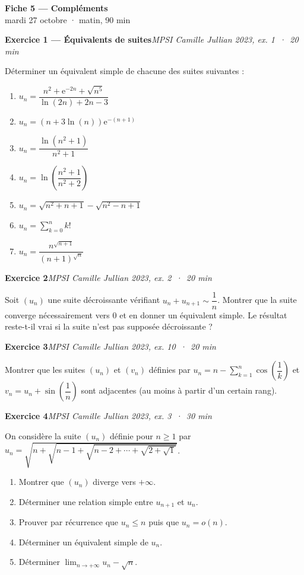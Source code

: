\documentclass[11pt,a4paper]{article}
\newcommand{\ee}{\mathrm{e}}
\newcommand{\exo}[3]{\vspace{1.1em}\noindent\textbf{\large #1}\hfill\textit{#2 \,·\, #3}\par\smallskip}
\begin{document}
\begin{center}
{\LARGE\bfseries Fiche 5 — Compléments}\\[0.3em]
{\large mardi 27 octobre · matin, 90 min}
\end{center}

\noindent{}


\exo{Exercice 1 — Équivalents de suites}{MPSI Camille Jullian 2023, ex. 1}{20 min}
\noindent Déterminer un équivalent simple de chacune des suites suivantes :
\begin{enumerate}[itemsep=0.4em]
\item $u_n=\dfrac{n^2+\ee^{-2n}+\sqrt{n^5}}{\ln(2n)+2n-3}$
\item $u_n=(n+3\ln(n))\ee^{-(n+1)}$
\item $u_n=\dfrac{\ln(n^2+1)}{n^2+1}$
\item $u_n=\ln\left(\dfrac{n^2+1}{n^2+2}\right)$
\item $u_n=\sqrt{n^2+n+1}-\sqrt{n^2-n+1}$
\item $u_n=\displaystyle\sum_{k=0}^{n}k!$
\item $u_n=\dfrac{n^{\sqrt{n+1}}}{(n+1)^{\sqrt{n}}}$
\end{enumerate}

\exo{Exercice 2}{MPSI Camille Jullian 2023, ex. 2}{20 min}
\noindent Soit $(u_n)$ une suite décroissante vérifiant $u_n+u_{n+1}\sim\dfrac1n$. Montrer que la suite converge nécessairement vers $0$ et en donner un équivalent simple. Le résultat reste-t-il vrai si la suite n'est pas supposée décroissante ?

\exo{Exercice 3}{MPSI Camille Jullian 2023, ex. 10}{20 min}
\noindent Montrer que les suites $(u_n)$ et $(v_n)$ définies par $u_n=n-\displaystyle\sum_{k=1}^{n}\cos\left(\dfrac1k\right)$ et $v_n=u_n+\sin\left(\dfrac1n\right)$ sont adjacentes (au moins à partir d'un certain rang).

\exo{Exercice 4}{MPSI Camille Jullian 2023, ex. 3}{30 min}
\noindent On considère la suite $(u_n)$ définie pour $n\geqslant 1$ par $u_n=\sqrt{n+\sqrt{n-1+\sqrt{n-2+\cdots+\sqrt{2+\sqrt{1}}}}}$.
\begin{enumerate}
\item Montrer que $(u_n)$ diverge vers $+\infty$.
\item Déterminer une relation simple entre $u_{n+1}$ et $u_n$.
\item Prouver par récurrence que $u_n\leqslant n$ puis que $u_n=o(n)$.
\item Déterminer un équivalent simple de $u_n$.
\item Déterminer $\displaystyle\lim_{n\to+\infty}u_n-\sqrt n$.
\end{enumerate}
\end{document}
